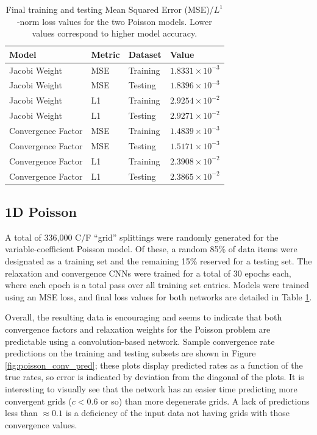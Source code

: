 \documentclass{siamart190516}
\begin{document}
\begin{table}[t]
\centering
\begin{tabular}{|l|l|l|l|}
\hline
Model & Metric & Dataset & Value \\

\hline
Jacobi Weight & MSE & Training & $1.8331 \times 10^{-3}$ \\
Jacobi Weight & MSE & Testing & $1.8396 \times 10^{-3}$ \\
Jacobi Weight & L1 & Training & $2.9254 \times 10^{-2}$ \\
Jacobi Weight & L1 & Testing & $2.9271 \times 10^{-2}$ \\
\hline
Convergence Factor & MSE & Training & $1.4839 \times 10^{-3}$ \\
Convergence Factor & MSE & Testing & $1.5171 \times 10^{-3}$ \\
Convergence Factor & L1 & Training & $2.3908 \times 10^{-2}$ \\
Convergence Factor & L1 & Testing & $2.3865 \times 10^{-2}$ \\
\hline
\end{tabular}
\caption{Final training and testing Mean Squared Error (MSE)/$L^1$-norm loss values for the two Poisson models.  Lower values correspond to higher model accuracy.}
\label{tab:poisson_loss}
\end{table}

\subsection{1D Poisson}

A total of 336,000 C/F ``grid'' splittings were randomly generated for the variable-coefficient Poisson model.  Of these, a random 85\% of data items were designated as a training set and the remaining 15\% reserved for a testing set.  The relaxation and convergence CNNs were trained for a total of 30 epochs each, where each epoch is a total pass over all training set entries.  Models were trained using an MSE loss, and final loss values for both networks are detailed in Table \ref{tab:poisson_loss}.

Overall, the resulting data is encouraging and seems to indicate that both convergence factors and relaxation weights for the Poisson problem are predictable using a convolution-based network.  Sample convergence rate predictions on the training and testing subsets are shown in Figure \ref{fig:poisson_conv_pred}; these plots display predicted rates as a function of the true rates, so error is indicated by deviation from the diagonal of the plots.  It is interesting to visually see that the network has an easier time predicting more convergent grids ($c < 0.6$ or so) than more degenerate grids.  A lack of predictions less than $\approx 0.1$ is a deficiency of the input data not having grids with those convergence values.
\end{document}
